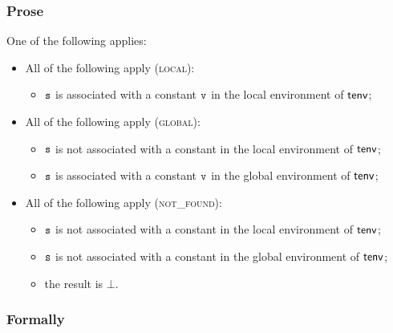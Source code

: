 \subsubsection{Prose}
One of the following applies:
\begin{itemize}
  \item All of the following apply (\textsc{local}):
  \begin{itemize}
    \item $\vs$ is associated with a constant $\vv$ in the local environment of $\tenv$;
  \end{itemize}

  \item All of the following apply (\textsc{global}):
  \begin{itemize}
    \item $\vs$ is not associated with a constant in the local environment of $\tenv$;
    \item $\vs$ is associated with a constant $\vv$ in the global environment of $\tenv$;
  \end{itemize}

  \item All of the following apply (\textsc{not\_found}):
  \begin{itemize}
    \item $\vs$ is not associated with a constant in the local environment of $\tenv$;
    \item $\vs$ is not associated with a constant in the global environment of $\tenv$;
    \item the result is $\bot$.
  \end{itemize}
\end{itemize}

\subsubsection{Formally}
\begin{mathpar}
\end{mathpar}

\begin{mathpar}
\end{mathpar}

\begin{mathpar}
\end{mathpar}

